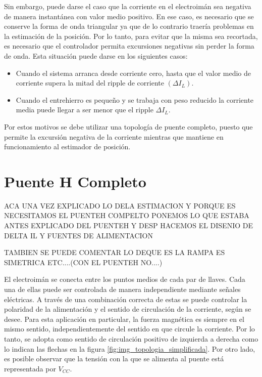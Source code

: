 Sin embargo, puede darse el caso que la corriente en el electroimán sea negativa de manera instantánea con valor medio positivo. En ese caso, es necesario que se conserve la forma de onda triangular ya que de lo contrario traería problemas en la estimación de la posición. Por lo tanto, para evitar que la misma sea recortada, es necesario que el controlador permita excursiones negativas sin perder la forma de onda. Esta situación puede darse en los siguientes casos:


\begin{itemize} 
	\item Cuando el sistema arranca desde corriente cero, hasta que el valor medio de corriente supera la mitad del ripple de corriente $(\Delta I_{L})$.
	
	\item Cuando el entrehierro es pequeño y se trabaja con peso reducido la corriente media puede llegar a ser menor que el ripple $\Delta I_{L}$.
\end{itemize}

\noindent Por estos motivos se debe utilizar una topología de puente completo, puesto que permite la excursión negativa de la corriente mientras que mantiene en funcionamiento al estimador de posición.

\section{Puente H Completo}

ACA UNA VEZ EXPLICADO LO DELA ESTIMACION Y PORQUE ES NECESITAMOS EL PUENTEH COMPELTO PONEMOS LO QUE ESTABA ANTES EXPLICADO DEL PUENTEH Y DESP HACEMOS EL DISENIO DE DELTA IL Y FUENTES DE ALIMENTACION

TAMBIEN SE PUEDE COMENTAR LO DEQUE ES LA RAMPA ES SIMETRICA ETC....(CON EL PUENTEH NO....)

El electroimán se conecta entre los puntos medios de cada par de llaves. Cada una de ellas puede ser controlada de manera independiente mediante señales eléctricas. A través de una combinación correcta de estas se puede controlar la polaridad de la alimentación y el sentido de circulación de la corriente, según se desee. Para esta aplicación en particular, la fuerza magnética es siempre en el mismo sentido, independientemente del sentido en que circule la corriente. Por lo tanto, se adopta como sentido de circulación positivo de izquierda a derecha como lo indican las flechas en la figura \ref{fig:img_topologia_simplificada}. Por otro lado, es posible observar que la tensión con la que se alimenta al puente está representada por $V_{CC}$.



